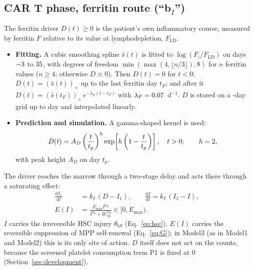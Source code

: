 \documentclass[11pt]{article}
\newcommand{\dd}{\mathrm{d}}
\newcommand{\pos}[1]{\left(#1\right)_{+}}
\begin{document}
\subsection{CAR T phase, ferritin route \texorpdfstring{(``b$_I$'')}{(b-I)}}
The ferritin driver $D(t)\geq 0$ is the patient's own inflammatory course, measured by ferritin $F$ relative to its value at lymphodepletion, $F_{\mathrm{LD}}$.
\begin{itemize}
\item \textbf{Fitting.} A cubic smoothing spline $\hat s(t)$ is fitted to $\log(F_i/F_{\mathrm{LD}})$ on days $-3$ to $35$, with degrees of freedom $\min(\max(4,\lfloor n/3\rfloor),8)$ for $n$ ferritin values ($n\geq4$; otherwise $D\equiv0$). Then $D(t)=0$ for $t<0$; $D(t)=\pos{\hat s(t)}$ up to the last ferritin day $t_F$; and after it $D(t)=\pos{\hat s(t_F)}\,e^{-\lambda_F(t-t_F)}$ with $\lambda_F=0.07$~d$^{-1}$. $D$ is stored on a \valDrvDt-day grid up to day \valDrvEnd{} and interpolated linearly.
\item \textbf{Prediction and simulation.} A gamma-shaped kernel is used:
\begin{equation}
D(t) = A_D\left(\frac{t}{t_p}\right)^{h}\exp\!\left[h\left(1-\frac{t}{t_p}\right)\right],\quad t>0;\qquad h=2, \label{eq:kernel}
\end{equation}
with peak height $A_D$ on day $t_p$.
\end{itemize}
The driver reaches the marrow through a two-stage delay and acts there through a saturating effect:
\begin{align}
\frac{\dd I_1}{\dd t} &= k_I\,(D - I_1), \qquad \frac{\dd I}{\dd t} = k_I\,(I_1 - I), \label{eq:lag}\\
E(I) &= \frac{E_{\max} I^{h_E}}{I^{h_E} + \mathrm{IC}_{50}^{h_E}} \in [0, E_{\max}). \label{eq:E}
\end{align}
$I$ carries the irreversible HSC injury $\theta_{bS}$ (Eq.~\ref{eq:hsc}). $E(I)$ carries the reversible suppression of MPP self-renewal (Eq.~\ref{eq:G}); in Model3 (as in Model1 and Model2) this is its only site of action. $D$ itself does not act on the counts, because the screened platelet consumption term P1 is fixed at 0 (Section~\ref{sec:development}).
\end{document}
